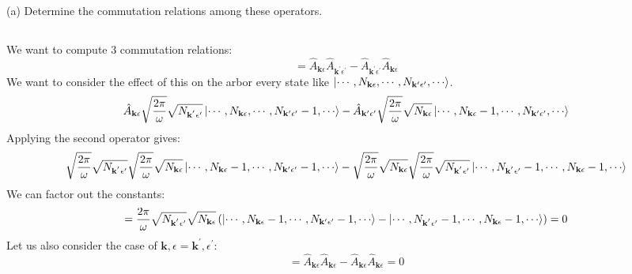 \documentclass[12pt]{article}
\begin{document}
(a) Determine the commutation relations among these operators.
\subsection{}
We want to compute 3 commutation relations:
\begin{equation}
  [\hat{A}_{\mathbf{k} \epsilon},\hat{A}_{\mathbf{k^{\prime}} \epsilon^{\prime}}] = \hat{A}_{\mathbf{k} \epsilon}\hat{A}_{\mathbf{k^{\prime}} \epsilon^{\prime}} - \hat{A}_{\mathbf{k^{\prime}} \epsilon^{\prime}}\hat{A}_{\mathbf{k} \epsilon}
\end{equation}
We want to consider the effect of this on the arbor every state like $\ket{\cdots ,N_{\mathbf{k} \epsilon}, \cdots, N_{\mathbf{k^{\prime}} \epsilon^{\prime}}, \cdots}$.
\begin{equation}
\hat{A}_{\mathbf{k} \epsilon}\sqrt{\frac{2\pi}{\omega }} \sqrt{N_{\mathbf{k^{^{\prime}}\epsilon^{\prime}}}}\ket{\cdots ,N_{\mathbf{k} \epsilon}, \cdots, N_{\mathbf{k^{\prime}} \epsilon^{\prime}}-1, \cdots} - \hat{A}_{\mathbf{k^{\prime}} \epsilon^{\prime}}\sqrt{\frac{2\pi}{\omega }} \sqrt{N_{\mathbf{k} \epsilon}}\ket{\cdots ,N_{\mathbf{k} \epsilon}-1, \cdots, N_{\mathbf{k^{\prime}} \epsilon^{\prime}}, \cdots}
\end{equation}
Applying the second operator gives:
\begin{equation}
  \sqrt{\frac{2\pi}{\omega }} \sqrt{N_{\mathbf{k^{^{\prime}}\epsilon^{\prime}}}}\sqrt{\frac{2\pi}{\omega }} \sqrt{N_{\mathbf{k} \epsilon}}\ket{\cdots ,N_{\mathbf{k} \epsilon}-1, \cdots, N_{\mathbf{k^{\prime}} \epsilon^{\prime}}-1, \cdots} - \sqrt{\frac{2\pi}{\omega }} \sqrt{N_{\mathbf{k} \epsilon}}\sqrt{\frac{2\pi}{\omega }} \sqrt{N_{\mathbf{k^{^{\prime}}\epsilon^{\prime}}}}\ket{\cdots ,N_{\mathbf{k^{^{\prime}}\epsilon^{\prime}}}-1, \cdots, N_{\mathbf{k} \epsilon}-1, \cdots}
\end{equation}
We can factor out the constants:
\begin{equation}
  = \frac{2\pi}{\omega } \sqrt{N_{\mathbf{k^{^{\prime}}\epsilon^{\prime}}}}\sqrt{N_{\mathbf{k} \epsilon}}\left( \ket{\cdots ,N_{\mathbf{k} \epsilon}-1, \cdots, N_{\mathbf{k^{\prime}} \epsilon^{\prime}}-1, \cdots} - \ket{\cdots ,N_{\mathbf{k^{^{\prime}}\epsilon^{\prime}}}-1, \cdots, N_{\mathbf{k} \epsilon}-1, \cdots}\right) = 0
\end{equation}
Let us also consider the case of $\mathbf{k},\epsilon = \mathbf{k^{\prime}},\epsilon^{\prime}$:
\begin{equation}
  [\hat{A}_{\mathbf{k} \epsilon},\hat{A}_{\mathbf{k} \epsilon}] = \hat{A}_{\mathbf{k} \epsilon}\hat{A}_{\mathbf{k} \epsilon} - \hat{A}_{\mathbf{k} \epsilon}\hat{A}_{\mathbf{k} \epsilon} = 0
\end{equation}
\end{document}

